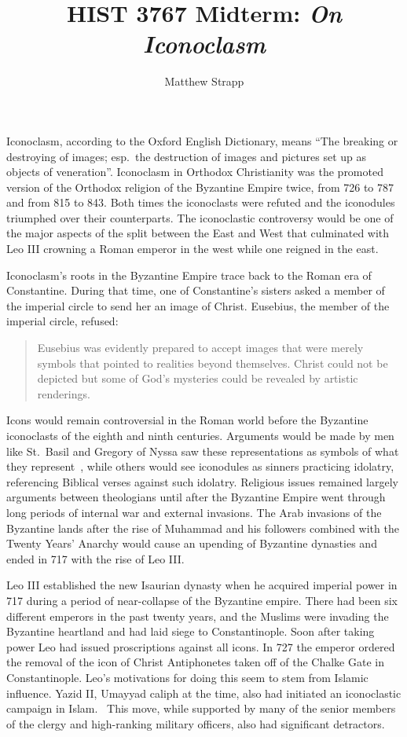 \documentclass[12pt]{article}
\title{HIST 3767 Midterm: \emph{On Iconoclasm}}
\author{Matthew Strapp}
\begin{document}
\begin{singlespace}
    \maketitle
\end{singlespace}
    Iconoclasm, according to the Oxford English Dictionary, means ``The breaking or destroying of images; esp.\ the destruction of images and pictures set up as objects of veneration''\cite{oed:iconoclasm}. Iconoclasm in Orthodox Christianity was the promoted version of the Orthodox religion of the Byzantine Empire twice, from 726 to 787 and from 815 to 843. Both times the iconoclasts were refuted and the iconodules triumphed over their counterparts. The iconoclastic controversy would be one of the major aspects of the split between the East and West that culminated with Leo III crowning a Roman emperor in the west while one reigned in the east.\

    Iconoclasm's roots in the Byzantine Empire trace back to the Roman era of Constantine. During that time, one of Constantine's sisters asked a member of the imperial circle to send her an image of Christ. Eusebius, the member of the imperial circle, refused: \begin{quote}
        Eusebius was evidently prepared to accept images that were merely symbols that pointed to realities beyond themselves. Christ could not be depicted but some of God's mysteries could be revealed by artistic renderings.~\cite[p. 13]{Noble1}
    \end{quote}\noindent
    Icons would remain controversial in the Roman world before the Byzantine iconoclasts of the eighth and ninth centuries. Arguments would be made by men like St.\ Basil and Gregory of Nyssa saw these representations as symbols of what they represent~\cite[pp. 16-17]{Noble1}, while others would see iconodules as sinners practicing idolatry, referencing Biblical verses against such idolatry. Religious issues remained largely arguments between theologians until after the Byzantine Empire went through long periods of internal war and external invasions. The Arab invasions of the Byzantine lands after the rise of Muhammad and his followers combined with the Twenty Years' Anarchy would cause an upending of Byzantine dynasties and ended in 717 with the rise of Leo III.\@ \
    
    Leo III established the new Isaurian dynasty when he acquired imperial power in 717 during a period of near-collapse of the Byzantine empire. There had been six different emperors in the past twenty years, and the Muslims were invading the Byzantine heartland and had laid siege to Constantinople. Soon after taking power Leo had issued proscriptions against all icons. In 727 the emperor ordered the removal of the icon of Christ Antiphonetes taken off of the Chalke Gate in Constantinople. Leo's motivations for doing this seem to stem from Islamic influence. Yazid II, Umayyad caliph at the time, also had initiated an iconoclastic campaign in Islam.~\cite[p. 51]{ByzNotes} This move, while supported by many of the senior members of the clergy and high-ranking military officers, also had significant detractors. \
\end{document}
